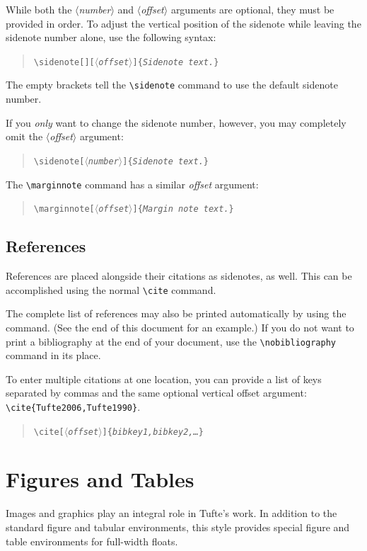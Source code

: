 \documentclass{tufte-handout}
\newcommand{\doccmd}[1]{\texttt{\textbackslash#1}}%
\newcommand{\docopt}[1]{\ensuremath{\langle}\textrm{\textit{#1}}\ensuremath{\rangle}}%
\newcommand{\docarg}[1]{\textrm{\textit{#1}}}%
\newcommand{\docenv}[1]{\textsf{#1}}%
\newenvironment{docspec}{\begin{quote}\noindent}{\end{quote}}%
\begin{document}
While both the \docopt{number} and \docopt{offset} arguments are optional, they
must be provided in order.  To adjust the vertical position of the sidenote
while leaving the sidenote number alone, use the following syntax:
\begin{docspec}
  \doccmd{sidenote[][\docopt{offset}]\{\docarg{Sidenote text.}\}}
\end{docspec}
The empty brackets tell the \Verb|\sidenote| command to use the default
sidenote number.

If you \emph{only} want to change the sidenote number, however, you may
completely omit the \docopt{offset} argument:
\begin{docspec}
  \doccmd{sidenote[\docopt{number}]\{\docarg{Sidenote text.}\}}
\end{docspec}

The \Verb|\marginnote| command has a similar \docarg{offset} argument:
\begin{docspec}
  \doccmd{marginnote[\docopt{offset}]\{\docarg{Margin note text.}\}}
\end{docspec}

\subsection{References}
References are placed alongside their citations as sidenotes,
as well.  This can be accomplished using the normal \Verb|\cite|
command.

The complete list of references may also be printed automatically by using
the \Verb|| command.  (See the end of this document for an
example.)  If you do not want to print a bibliography at the end of your
document, use the \Verb|\nobibliography| command in its place.

To enter multiple citations at one location,\cite{Tufte2006,Tufte1990} you can
provide a list of keys separated by commas and the same optional vertical
offset argument: \Verb|\cite{Tufte2006,Tufte1990}|.
\begin{docspec}
  \doccmd{cite[\docopt{offset}]\{\docarg{bibkey1,bibkey2,\ldots}\}}
\end{docspec}

\section{Figures and Tables}\label{sec:figures-and-tables}
Images and graphics play an integral role in Tufte's work.
In addition to the standard \docenv{figure} and \docenv{tabular} environments,
this style provides special figure and table environments for full-width
floats.
\end{document}
